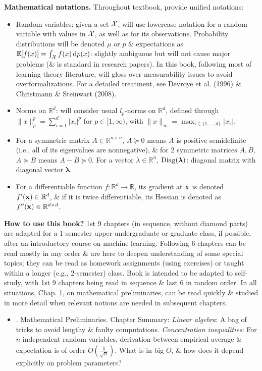 \documentclass{article}
\begin{document}
\begin{enumerate}
	{\bf Mathematical notations.} Throughout textbook, provide unified notations:
	\begin{itemize}
		\item Random variables: given a set ${\cal X}$, will use lowercase notation for a random variable with values in ${\cal X}$, as well as for its observations. Probability distributions will be denoted $\mu$ or $p$ \& expectations as $\mathbb{E}[f(x)] = \int_{{\cal X}} f(x)\,{\rm d}p(x)$: slightly ambiguous but will not cause major problems (\& is standard in research papers). In this book, following most of learning theory literature, will gloss over measurability issues to avoid overformalizations. For a detailed treatment, see Devroye et al. (1996) \& Christmann \& Steinwart (2008).
		\item Norms on $\mathbb{R}^d$: will consider usual $l_p$-norms on $\mathbb{R}^d$, defined through $\|x\|_p^p = \sum_{i=1}^d |x_i|^p$ for $p\in[1,\infty)$, with $\|x\|_\infty = \max_{i\in\{1,\ldots,d\}} |x_i|$.
		\item For a symmetric matrix $A\in\mathbb{R}^{n\times n}$, $A\succeq0$ means $A$ is positive semidefinite (i.e., all of its eigenvalues are nonnegative), \& for 2 symmetric matrices $A,B$, $A\succeq B$ means $A - B\succeq0$. For a vector $\lambda\in\mathbb{R}^n$, ${\rm Diag}(\boldsymbol{\lambda})$: diagonal matrix with diagonal vector $\boldsymbol{\lambda}$.
		\item For a differentiable function $f:\mathbb{R}^d\to\mathbb{R}$, its gradient at ${\bf x}$ is denoted $f'({\bf x})\in\mathbb{R}^d$, \& if it is twice differentiable, its Hessian is denoted as $f''({\bf x})\in\mathbb{R}^{d\times d}$.
	\end{itemize}
	{\bf How to use this book?} 1st 9 chapters (in sequence, without diamond parts) are adapted for a 1-semester upper-undergraduate or graduate class, if possible, after an introductory course on machine learning. Following 6 chapters can be read mostly in any order \& are here to deepen understanding of some special topics; they can be read as homework assignments (using exercises) or taught within a longer (e.g., 2-semester) class. Book is intended to be adapted to self-study, with 1st 9 chapters being read in sequence \& last 6 in random order. In all situations, Chap. 1, on mathematical preliminaries, can be read quickly \& studied in more detail when relevant notions are needed in subsequent chapters.
	
	\begin{itemize}
		\item {. Mathematical Preliminaries.} Chapter Summary: {\it Linear algebra}: A bag of tricks to avoid lengthy \& faulty computations. {\it Concentration inequalities}: For $n$ independent random variables, derivation between empirical average \& expectation is of order $O(\frac{1}{\sqrt{n}})$. What is in big $O$, \& how does it depend explicitly on problem parameters?
		

\end{itemize}
\end{enumerate}
\end{document}

